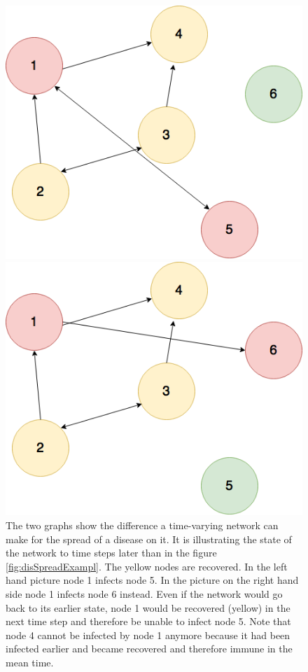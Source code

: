 \begin{figure}[htbp]
\begin{minipage}{0.5\textwidth}
\centering
\noindent\includegraphics[width=0.9\linewidth,height=\textheight,
keepaspectratio]{Graph4.png} 
\end{minipage}
\begin{minipage}{0.5\textwidth}
\centering
\noindent\includegraphics[width=0.9\linewidth,height=\textheight,
keepaspectratio]{Graph5.png} 
\end{minipage}
\caption[Disease Spread On A Time Dependant Network]{The two graphs show the difference a time-varying network can make for the spread of a disease on it. It is illustrating the state of the network to time steps later than in the figure \ref{fig:disSpreadExampl}. The yellow nodes are recovered. In the left hand picture node 1 infects node 5. In the picture on the right hand side node 1 infects node 6 instead. Even if the network would go back to its earlier state, node 1 would be recovered (yellow) in the next time step and therefore be unable to infect node 5. Note that node 4 cannot be infected by node 1 anymore because it had been infected earlier and became recovered and therefore immune in the mean time.}
\label{fig:timeDependantNetworkSpread}
\end{figure}


